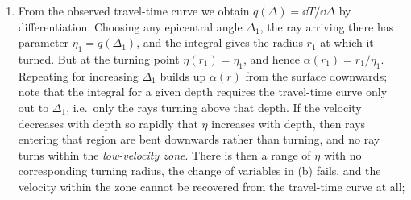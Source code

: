 \documentclass[a4paper,10pt]{paper}
\begin{document}
\begin{enumerate}
\begin{enumerate}
\begin{equation*}
\end{equation*}
The region of integration is $\eta_{1}\le q\le\eta\le\eta_{b}$, so exchanging the order gives
\begin{equation*}
    2\int_{\eta_{1}}^{\eta_{b}}\dd\eta\,\frac{\dd\ln r}{\dd\eta}\int_{\eta_{1}}^{\eta}\frac{q\,\dd q}{\sqrt{(\eta^{2}-q^{2})(q^{2}-\eta_{1}^{2})}}
    =2\cdot\frac{\pi}{2}\int_{\eta_{1}}^{\eta_{b}}\frac{\dd\ln r}{\dd\eta}\dd\eta=\pi\ln\frac{b}{r_{1}},
\end{equation*}
as required. To convert to an integral over the travel-time curve, note that the derivative of $\cosh^{-1}(q/\eta_{1})$ with respect to $q$ 
is $(q^{2}-\eta_{1}^{2})^{-1/2}$, so that integrating by parts
\begin{equation*}
    \int_{\eta_{1}}^{\eta_{b}}\frac{\Delta(q)}{\sqrt{q^{2}-\eta_{1}^{2}}}\dd q=\left[\Delta(q)\cosh^{-1}\frac{q}{\eta_{1}}\right]_{\eta_{1}}^{\eta_{b}}
    -\int_{\eta_{1}}^{\eta_{b}}\cosh^{-1}\!\left(\frac{q}{\eta_{1}}\right)\frac{\dd\Delta}{\dd q}\dd q.
\end{equation*}
The boundary term vanishes at both ends, since $\cosh^{-1}(1)=0$ and $\Delta(\eta_{b})=0$ (the ray of parameter $\eta_{b}$ grazes the surface). 
As $q$ increases from $\eta_{1}$ to $\eta_{b}$, $\Delta$ decreases from $\Delta_{1}$ to $0$, so reversing the direction of integration gives
\begin{equation*}
    \ln\frac{b}{r_{1}}=\frac{1}{\pi}\int_{0}^{\Delta_{1}}\cosh^{-1}\!\left[\frac{q(\Delta)}{\eta_{1}}\right]\dd\Delta.
\end{equation*}
\item From the observed travel-time curve we obtain $q(\Delta)=\dd T/\dd\Delta$ by differentiation. Choosing any epicentral angle $\Delta_{1}$, 
the ray arriving there has parameter $\eta_{1}=q(\Delta_{1})$, and the integral gives the radius $r_{1}$ at which it turned. But at the turning 
point $\eta(r_{1})=\eta_{1}$, and hence $\alpha(r_{1})=r_{1}/\eta_{1}$. Repeating for increasing $\Delta_{1}$ builds up $\alpha(r)$ from the surface 
downwards; note that the integral for a given depth requires the travel-time curve only out to $\Delta_{1}$, i.e.\ only the rays turning above 
that depth. If the velocity decreases with depth so rapidly that $\eta$ increases with depth, then rays entering that region are bent 
downwards rather than turning, and no ray turns within the \emph{low-velocity zone}. There is then a range of $\eta$ with no corresponding 
turning radius, the change of variables in (b) fails, and the velocity within the zone cannot be recovered from the travel-time curve at all; 

\end{enumerate}
\end{enumerate}
\end{document}
